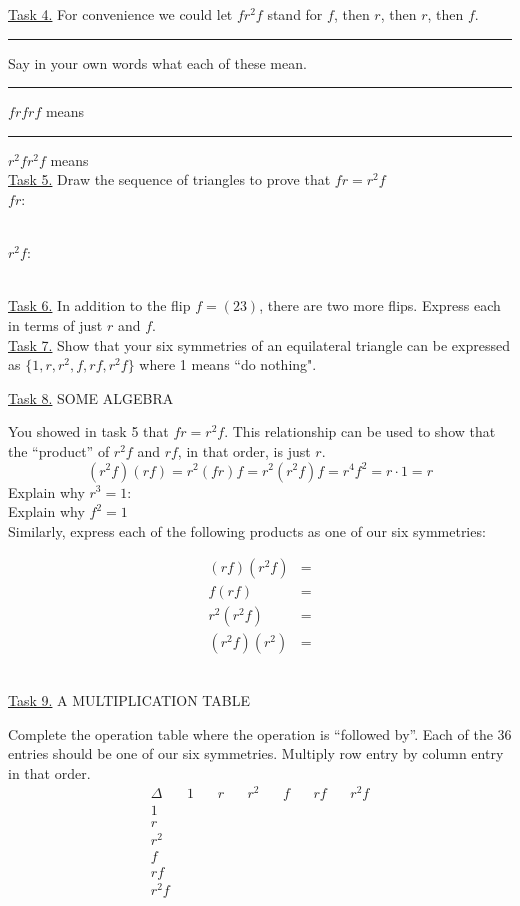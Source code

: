 \documentclass[12pt]{book}
\theoremstyle{definition}
\begin{document}
\underline{Task 4.}  For convenience we could let $fr^2f$ stand for $f$, then $r$, then $r$, then $f$.\\
\rule{.8in}{0in}Say in your own words what each of these mean.\\
\rule{.8in}{0in}$frfrf$ means\\[.25in]
\rule{.8in}{0in}$r^2fr^2f$ means\\[.25in]
\underline{Task 5.}  Draw the sequence of triangles to prove that $fr=r^2f$\\
$fr$\quad: \begin{minipage}{3.75in}\def\svgwidth{1.75in}\end{minipage}\\[.1in]
$r^2f$\quad: \begin{minipage}{3.75in}\def\svgwidth{1.75in}\end{minipage}\\[.1in]
\underline{Task 6.}  In addition to the flip $f=(23)$, there are two more flips.  Express each in terms of just $r$ and $f$.\\
\vfill
\underline{Task 7.}   Show that your six symmetries of an equilateral triangle can be expressed as $\{1, r, r^2, f, rf, r^2f\}$ where 1 means ``do nothing".%
\vfill%
\vfill

\underline{Task 8.}  SOME ALGEBRA

You showed in task 5 that $fr=r^2f$.  This relationship can be used to show that the ``product'' of $r^2f$ and $rf$, in that order, is just $r$.
$$(r^2f)(rf)=r^2(fr)f=r^2(r^2f)f=r^4f^2=r\cdot 1 =r$$
Explain why $r^3=1$:\\[.1in]
Explain why $f^2=1$\\[.1in]
Similarly, express each of the following products as one of our six symmetries:\\
\begin{minipage}{1.5in}\begin{equation*}\begin{split}
(rf)(r^2f) &=\\
f(rf)&=\\
r^2(r^2f)&=\\
(r^2f)(r^2) &=
\end{split}\end{equation*}\end{minipage}\\[.1in]
\underline{Task 9.}  A MULTIPLICATION TABLE

Complete the operation table where the operation is ``followed by''.  Each of the 36 entries should be one of our six symmetries.  Multiply row entry by column entry in that order.
$$\begin{array}{r|rrrrrr}
\Delta & ~~1~~ & ~~r~~ & ~~r^2~~ & ~~f~~ & ~~rf~~ & ~~r^2f \\
\hline
1 &\\
r & \\
r^2 &\\
f & \\
rf & \\
r^2f &
\end{array}$$
\end{document}
